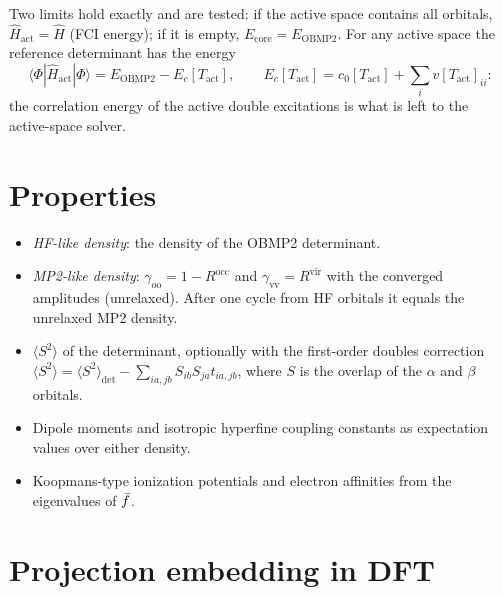 Two limits hold exactly and are tested: if the active space contains all
orbitals, $\hat H_{\mathrm{act}}=\hat H$ (FCI energy); if it is empty,
$E_{\mathrm{core}}=E_{\mathrm{OBMP2}}$. For any active space the reference
determinant has the energy
\begin{equation}
  \langle\Phi|\hat H_{\mathrm{act}}|\Phi\rangle
  = E_{\mathrm{OBMP2}}-E_c[T_{\mathrm{act}}],\qquad
  E_c[T_{\mathrm{act}}]=c_0[T_{\mathrm{act}}]+\sum_i v[T_{\mathrm{act}}]_{ii}:
\end{equation}
the correlation energy of the active double excitations is what is left to
the active-space solver.

\section{Properties}
\label{sec:theory-properties}

\begin{itemize}
  \item \emph{HF-like density}: the density of the OBMP2 determinant.
  \item \emph{MP2-like density}: $\gamma_{\mathrm{oo}}=1-R^{\mathrm{occ}}$ and
        $\gamma_{\mathrm{vv}}=R^{\mathrm{vir}}$ with the converged amplitudes
        (unrelaxed). After one cycle from HF orbitals it equals the unrelaxed
        MP2 density.
  \item $\langle S^2\rangle$ of the determinant, optionally with the
        first-order doubles correction
        $\langle S^2\rangle = \langle S^2\rangle_{\mathrm{det}}
        - \sum_{ia,jb} S_{ib}S_{ja}t_{ia,jb}$, where $S$ is the overlap of
        the $\alpha$ and $\beta$ orbitals.
  \item Dipole moments and isotropic hyperfine coupling constants as
        expectation values over either density.
  \item Koopmans-type ionization potentials and electron affinities from the
        eigenvalues of $\bar f$.
\end{itemize}

\section{Projection embedding in DFT}
\label{sec:theory-embed}

